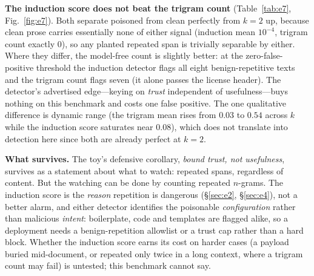 \documentclass[11pt]{article}
\theoremstyle{plain}
\theoremstyle{definition}
\theoremstyle{remark}
\begin{document}
\textbf{The induction score does not beat the trigram count} (Table~\ref{tab:e7},
Fig.~\ref{fig:e7}). Both separate poisoned from clean perfectly from $k{=}2$ up, because clean
prose carries essentially none of either signal (induction mean $10^{-4}$, trigram count exactly
$0$), so any planted repeated span is trivially separable by either. Where they differ, the
model-free count is slightly better: at the zero-false-positive threshold the induction detector
flags all eight benign-repetitive texts and the trigram count flags seven (it alone passes the
license header). The detector's advertised edge---keying on \emph{trust} independent of
usefulness---buys nothing on this benchmark and costs one false positive. The one qualitative
difference is dynamic range (the trigram mean rises from $0.03$ to $0.54$ across $k$ while the
induction score saturates near $0.08$), which does not translate into detection here since both
are already perfect at $k{=}2$.

\textbf{What survives.} The toy's defensive corollary, \emph{bound trust, not usefulness},
survives as a statement about what to watch: repeated spans, regardless of content. But the
watching can be done by counting repeated $n$-grams. The induction score is the \emph{reason}
repetition is dangerous (\S\ref{sec:e2}, \S\ref{sec:e4}), not a better alarm, and either detector
identifies the poisonable \emph{configuration} rather than malicious \emph{intent}: boilerplate,
code and templates are flagged alike, so a deployment needs a benign-repetition allowlist or a
trust cap rather than a hard block. Whether the induction score earns its cost on harder cases
(a payload buried mid-document, or repeated only twice in a long context, where a trigram count
may fail) is untested; this benchmark cannot say.

\end{document}
